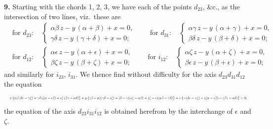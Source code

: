 \documentclass[11pt]{article}
\begin{document}
\medskip
\noindent\textbf{9.} Starting with the chords 1, 2, 3, we have each of the points $d_{23}$, \&c., as the intersection of two lines, viz.\ these are
\[
\begin{aligned}
&\text{for } d_{23}\colon\quad
\begin{cases} \alpha\beta\,z - y\,(\alpha + \beta) + x = 0, \\ \gamma\delta\,z - y\,(\gamma + \delta) + x = 0; \end{cases}
\qquad
\text{for } d_{31}\colon\quad
\begin{cases} \alpha\gamma\,z - y\,(\alpha + \gamma) + x = 0, \\ \beta\delta\,z - y\,(\beta + \delta) + x = 0; \end{cases} \\[4pt]
&\text{for } d_{12}\colon\quad
\begin{cases} \alpha\epsilon\,z - y\,(\alpha + \epsilon) + x = 0, \\ \beta\zeta\,z - y\,(\beta + \zeta) + x = 0; \end{cases}
\qquad
\text{for } i_{12}\colon\quad
\begin{cases} \alpha\zeta\,z - y\,(\alpha + \zeta) + x = 0, \\ \beta\epsilon\,z - y\,(\beta + \epsilon) + x = 0; \end{cases}
\end{aligned}
\]
and similarly for $i_{23}$, $i_{31}$. We thence find without difficulty for the axis $d_{23}d_{31}d_{12}$ the equation
\[
\resizebox{\textwidth}{!}{$\displaystyle
x\,\bigl\{\alpha\beta\,(\delta\epsilon - \gamma\zeta) + \gamma\delta\,(\zeta\alpha - \epsilon\beta) + \epsilon\zeta\,(\beta\gamma - \alpha\delta)\bigr\}
+ y\,\bigl\{(\beta - \alpha)(\gamma\delta - \epsilon\zeta) + (\delta - \gamma)(\epsilon\zeta - \alpha\beta) + (\zeta - \epsilon)(\alpha\beta - \gamma\delta)\bigr\}
+ z\,\bigl\{-(\delta\epsilon - \gamma\zeta) - (\zeta\alpha - \epsilon\beta) - (\beta\gamma - \alpha\delta)\bigr\} = 0;
$}
\]
the equation of the axis $d_{23}i_{31}i_{12}$ is obtained herefrom by the interchange of $\epsilon$ and $\zeta$.
\end{document}
